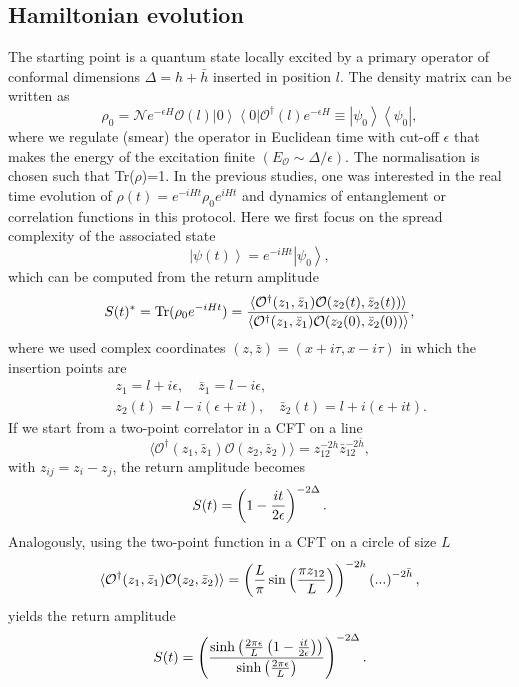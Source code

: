 \documentclass[aps,prl,twocolumn,showpacs,preprintnumbers,amsmath,amssymb]{revtex4-1}
\def\frac#1#2{{#1\over #2}}
\def\be{\begin{equation}}
\def\ee{\end{equation}}
\newcommand{\bea}{\begin{eqnarray}}
\newcommand{\eea}{\end{eqnarray}}
\newcommand{\ket}[1]{\left| #1 \right>}
\newcommand{\bra}[1]{\left< #1 \right|}
\newcommand{\ketbra}[1]{\left|#1\right>\left<#1\right|}
\begin{document}
\subsection{Hamiltonian evolution}
The starting point is a quantum state locally excited by a primary operator of conformal dimensions $\Delta=h+\bar{h}$ inserted in position $l$. The density matrix can be written as
\be
\rho_0=\mathcal{N}e^{-\epsilon H}\mathcal{O}(l)\ket{0}\bra{0}\mathcal{O}^\dagger(l)e^{-\epsilon H}\equiv \ketbra{\psi_0},
\ee
where we regulate (smear) the operator in Euclidean time with cut-off $\epsilon$ that makes the energy of the excitation finite $(E_\mathcal{O}\sim\Delta/\epsilon)$. The normalisation is chosen such that Tr($\rho$)=1. In the previous studies, one was interested in the real time evolution of $\rho(t)=e^{-iHt}\rho_0 e^{iHt}$ and dynamics of entanglement or correlation functions in this protocol. Here we first focus on the spread complexity of the associated state
\be
\ket{\psi(t)}=e^{-iHt}\ket{\psi_0},
\ee
which can be computed from the return amplitude
\be
S(t)^*=\text{Tr}(\rho_0e^{-iHt})=\frac{\langle \mathcal{O}^\dagger(z_1,\bar{z}_1)\mathcal{O}(z_2(t),\bar{z}_2(t))\rangle}{\langle\mathcal{O}^\dagger(z_1,\bar{z}_1) \mathcal{O}(z_2(0),\bar{z}_2(0))\rangle},
\ee
where we used complex coordinates $(z,\bar{z})=(x+i\tau,x-i\tau)$ in which the insertion points are
\bea
&&z_1=l+i\epsilon,\quad \bar{z}_1=l-i\epsilon,\nonumber\\
&&z_2(t)=l-i(\epsilon+it),\quad \bar{z}_2(t)=l+i(\epsilon+it).
\eea
If we start from a two-point correlator in a CFT on a line 
\be
\langle\mathcal{O}^\dagger(z_1,\bar{z}_1) \mathcal{O}(z_2,\bar{z}_2)\rangle=z^{-2h}_{12}\bar{z}^{-2\bar{h}}_{12},
\ee
with $z_{ij}=z_i -z_j$, the return amplitude becomes
\be
S(t)=\left(1-\frac{it}{2\epsilon}\right)^{-2\Delta}.\label{retSInf}
\ee
Analogously, using the two-point function in a CFT on a circle of size $L$ 
\be
\langle\mathcal{O}^\dagger(z_1,\bar{z}_1) \mathcal{O}(z_2,\bar{z}_2)\rangle=\left(\frac{L}{\pi }\sin\left(\frac{\pi z_{12}}{L}\right)\right)^{-2h}\left(...\right)^{-2\bar{h}},
\ee
yields the return amplitude 
\be
S(t)=\left(\frac{\sinh\left(\frac{2\pi\epsilon}{L}\left(1-\frac{it}{2\epsilon}\right)\right)}{\sinh\left(\frac{2\pi\epsilon}{L}\right)}\right)^{-2\Delta}.\label{ReAmpL}
\ee
\end{document}
